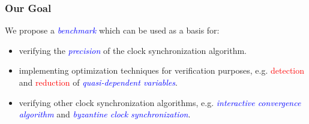 \documentclass[serif]{beamer}
\begin{document}
\begin{frame}\frametitle{\textbf{Our Goal}}
We propose a \emph{\textcolor{blue}{benchmark}} which can be used as a basis for: 
\begin{itemize}
	\item verifying the \emph{\textcolor{blue}{precision}} of the clock synchronization algorithm. 
	\item implementing optimization techniques for verification purposes, e.g. 
				\textcolor{red}{detection} and \textcolor{red}{reduction} of \emph{\textcolor{blue}{quasi-dependent variables}}.
	\item verifying other clock synchronization algorithms, e.g. \emph{\textcolor{blue}{interactive convergence algorithm}}	and 
				\emph{\textcolor{blue}{byzantine clock synchronization}}.
\end{itemize}
\end{frame}
\end{document}
